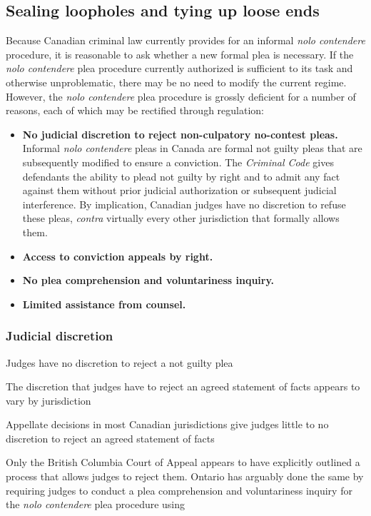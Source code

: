 \subsection{Sealing loopholes and tying up loose ends}

Because Canadian criminal law currently provides for an informal \textit{nolo contendere} procedure, it is reasonable to ask whether a new formal plea is necessary. If the \textit{nolo contendere} plea procedure currently authorized is sufficient to its task and otherwise unproblematic, there may be no need to modify the current regime. However, the \textit{nolo contendere} plea procedure is grossly deficient for a number of reasons, each of which may be rectified through regulation:

\begin{itemize}
    \item \textbf{No judicial discretion to reject non-culpatory no-contest pleas.} Informal \textit{nolo contendere} pleas in Canada are formal not guilty pleas that are subsequently modified to ensure a conviction. The \textit{Criminal Code} gives defendants the ability to plead not guilty by right and to admit any fact against them without prior judicial authorization or subsequent judicial interference. By implication, Canadian judges have no discretion to refuse these pleas, \textit{contra} virtually every other jurisdiction that formally allows them.
    \item \textbf{Access to conviction appeals by right.} 
    \item \textbf{No plea comprehension and voluntariness inquiry.}
    \item \textbf{Limited assistance from counsel.}
\end{itemize}

\subsubsection{Judicial discretion}



Judges have no discretion to reject a not guilty plea

The discretion that judges have to reject an agreed statement of facts appears to vary by jurisdiction

Appellate decisions in most Canadian jurisdictions give judges little to no discretion to reject an agreed statement of facts

Only the British Columbia Court of Appeal appears to have explicitly outlined a process that allows judges to reject them. Ontario has arguably done the same by requiring judges to conduct a plea comprehension and voluntariness inquiry for the \textit{nolo contendere} plea procedure using 

